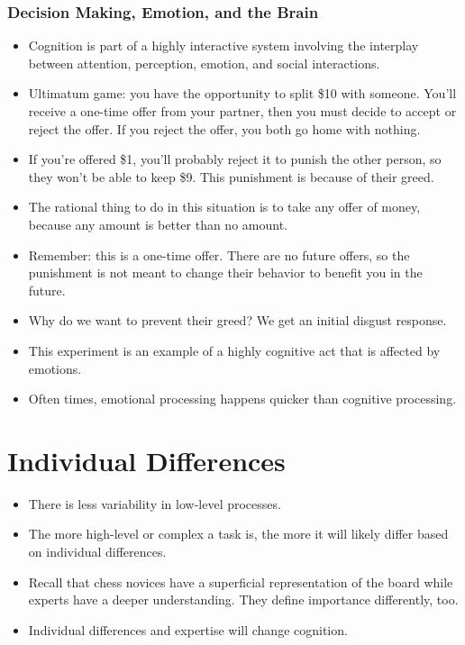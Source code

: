 \documentclass[]{article}
\begin{document}
			\subsubsection{Decision Making, Emotion, and the Brain}
				\begin{itemize}
					\item Cognition is part of a highly interactive system involving the interplay between attention, perception, emotion, and social interactions.
					\item Ultimatum game: you have the opportunity to split \$10 with someone. You'll receive a one-time offer from your partner, then you must decide to accept or reject the offer. If you reject the offer, you both go home with nothing.
					\item If you're offered \$1, you'll probably reject it to punish the other person, so they won't be able to keep \$9. This punishment is because of their greed.
					\item The rational thing to do in this situation is to take any offer of money, because any amount is better than no amount.
					\item Remember: this is a one-time offer. There are no future offers, so the punishment is not meant to change their behavior to benefit you in the future.
					\item Why do we want to prevent their greed? We get an initial disgust response.
					\item This experiment is an example of a highly cognitive act that is affected by emotions.
					\item Often times, emotional processing happens quicker than cognitive processing.
				\end{itemize}
	
	\section{Individual Differences}
		\begin{itemize}
			\item There is less variability in low-level processes.
			\item The more high-level or complex a task is, the more it will likely differ based on individual differences.
			\item Recall that chess novices have a superficial representation of the board while experts have a deeper understanding. They define importance differently, too.
			\item Individual differences and expertise will change cognition.
		\end{itemize}
		
\end{document}
